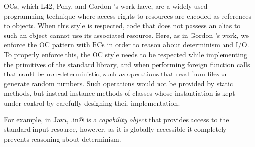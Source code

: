 


OCs, which L42, Pony, and Gordon \etal's work have, are a widely used~\cite{miller2003capability,noble2016abstract,karger1988improving} programming technique where access rights to resources are encoded as references to objects. When this style
is respected, code that does not possess an alias to such an object cannot use its associated resource.
Here, as in Gordon \etal's work, we enforce the OC pattern with RCs in order to reason about determinism and I/O. To properly enforce this, the OC style needs to be respected while implementing the primitives of the standard library, and when performing foreign function calls that could be non-deterministic, such as operations that read from files or generate random numbers. Such operations would not be provided by static methods, but instead instance methods of classes whose instantiation is kept under control
by carefully designing their implementation. 




\lstset{language=Java}
 For example, in Java, \Q@System.in@%
 \lstset{language=FortyTwo}
 is a \emph{capability object} that provides access to the standard input resource, however, as it is globally accessible it completely prevents reasoning about determinism. 

